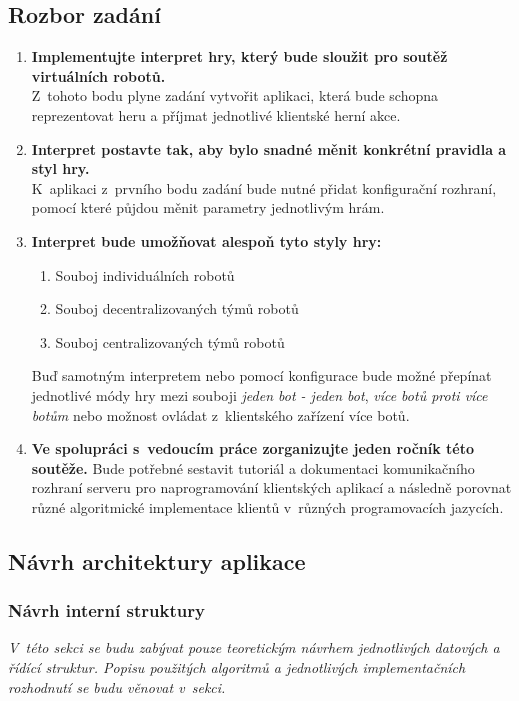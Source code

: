 \subsection{Rozbor zadání}
\begin{enumerate}
	\item
	{\bfseries Implementujte interpret hry, který bude sloužit pro soutěž virtuálních robotů.}\\
	Z~tohoto bodu plyne zadání vytvořit aplikaci, která bude schopna reprezentovat heru a příjmat jednotlivé klientské herní akce.

	\item
	{\bfseries Interpret postavte tak, aby bylo snadné měnit konkrétní pravidla a styl hry.}\\
	K~aplikaci z~prvního bodu zadání bude nutné přidat konfigurační rozhraní, pomocí které půjdou měnit parametry jednotlivým hrám.

	\item
	{\bfseries Interpret bude umožňovat alespoň tyto styly hry:}
		\begin{enumerate}
			\item Souboj individuálních robotů
			\item Souboj decentralizovaných týmů robotů
			\item Souboj centralizovaných týmů robotů
		\end{enumerate}
	Buď samotným interpretem nebo pomocí konfigurace bude možné přepínat jednotlivé módy hry mezi souboji \emph{jeden bot - jeden bot}, \emph{více botů proti více botům} nebo možnost ovládat z~klientského zařízení více botů.

	\item
	{\bfseries Ve spolupráci s~vedoucím práce zorganizujte jeden ročník této soutěže.}
	Bude potřebné sestavit tutoriál a dokumentaci komunikačního rozhraní serveru pro naprogramování klientských aplikací a následně porovnat různé algoritmické implementace klientů v~různých programovacích jazycích.
\end{enumerate}
\subsection{Návrh architektury aplikace}

\subsubsection{Návrh interní struktury}

\textit{
	V~této sekci se budu zabývat pouze teoretickým návrhem jednotlivých datových a řídící struktur. Popisu použitých algoritmů a jednotlivých implementačních rozhodnutí se budu věnovat v~sekci.
}


